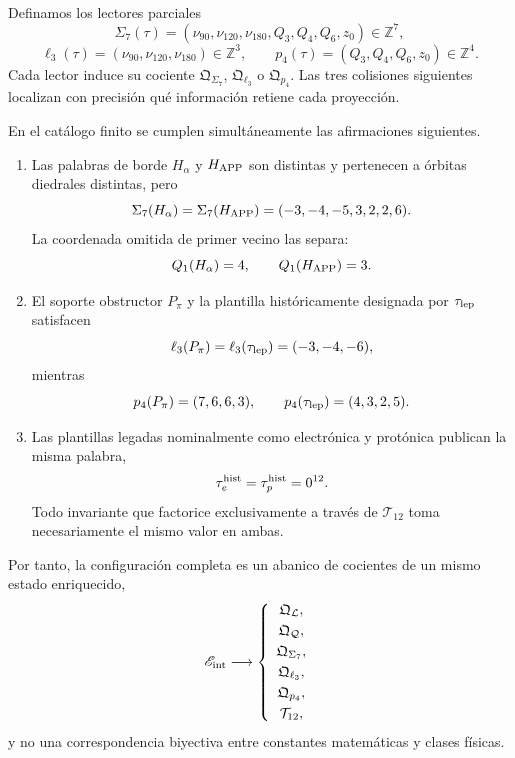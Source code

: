 Definamos los lectores parciales
\[
 \Sigma_7(\tau)=
 (\nu_{90},\nu_{120},\nu_{180},Q_3,Q_4,Q_6,z_0)
 \in\mathbb Z^7,
\]
\[
 \ell_3(\tau)=(\nu_{90},\nu_{120},\nu_{180})\in\mathbb Z^3,
 \qquad
 p_4(\tau)=(Q_3,Q_4,Q_6,z_0)\in\mathbb Z^4.
\]
Cada lector induce su cociente \(\mathfrak Q_{\Sigma_7}\),
\(\mathfrak Q_{\ell_3}\) o \(\mathfrak Q_{p_4}\). Las tres colisiones
siguientes localizan con precisión qué información retiene cada proyección.

\begin{theorem}
\label{thm:configuracion-cocientes-conjugados-rev11}
En el catálogo finito se cumplen simultáneamente las afirmaciones siguientes.
\begin{enumerate}[label=\textup{(\roman*)},leftmargin=2.2em]
 \item Las palabras de borde \(H_\alpha\) y \(H_{\rm APP}\) son distintas
 y pertenecen a órbitas diedrales distintas, pero
 \[
  \Sigma_7(H_\alpha)=\Sigma_7(H_{\rm APP})
  =(-3,-4,-5,3,2,2,6).
 \]
 La coordenada omitida de primer vecino las separa:
 \[
  Q_1(H_\alpha)=4,
  \qquad Q_1(H_{\rm APP})=3.
 \]

 \item El soporte obstructor \(P_\pi\) y la plantilla históricamente
 designada por \(\tau_{\rm lep}\) satisfacen
 \[
  \ell_3(P_\pi)=\ell_3(\tau_{\rm lep})=(-3,-4,-6),
 \]
 mientras
 \[
  p_4(P_\pi)=(7,6,6,3),
  \qquad p_4(\tau_{\rm lep})=(4,3,2,5).
 \]

 \item Las plantillas legadas nominalmente como electrónica y protónica
 publican la misma palabra,
 \[
  \tau_e^{\rm hist}=\tau_p^{\rm hist}=0^{12}.
 \]
 Todo invariante que factorice exclusivamente a través de
 \(\mathcal T_{12}\) toma necesariamente el mismo valor en ambas.
\end{enumerate}
Por tanto, la configuración completa es un abanico de cocientes de un mismo
estado enriquecido,
\begin{equation}
 \mathscr E_{\rm int}
 \longrightarrow
 \left\{
 \begin{array}{c}
  \mathfrak Q_{\mathcal L},\\[1mm]
  \mathfrak Q_{\mathcal Q},\\[1mm]
  \mathfrak Q_{\Sigma_7},\\[1mm]
  \mathfrak Q_{\ell_3},\\[1mm]
  \mathfrak Q_{p_4},\\[1mm]
  \mathcal T_{12},
 \end{array}
 \right.
 \label{eq:abanico-cocientes-rev11}
\end{equation}
y no una correspondencia biyectiva entre constantes matemáticas y clases
físicas.
\end{theorem}

